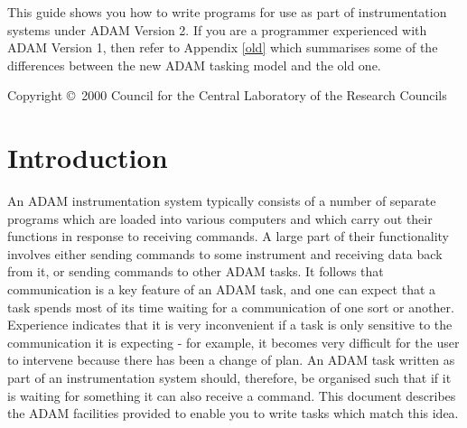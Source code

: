 \documentclass[twoside,11pt]{article}
\newcommand{\stardocinitials}  {SUN}
\newcommand{\stardoccopyright}
{Copyright \copyright\ 2000 Council for the Central Laboratory of the Research Councils}
\newcommand{\stardocnumber}    {134.3}
\newcommand{\stardocabstract}  {
This guide shows you how to write programs for use as part of
instrumentation systems under ADAM Version 2. If you are a programmer
experienced with ADAM Version 1, then refer to Appendix \ref{old} which
summarises some of the differences between the new ADAM tasking model
and the old one.
}
\newcommand{\stardocname}{\stardocinitials /\stardocnumber}
\newenvironment{latexonly}{}{}
\newcommand{\xlabel}[1]{}
\renewcommand{\_}{\texttt{\symbol{95}}}
\renewcommand{\thepage}{\roman{page}}
\begin{document}
\stardocabstract

\begin{latexonly}
\newpage
\vspace*{\fill}
\stardoccopyright
\end{latexonly}

  \newpage
  \begin{latexonly}
    \setlength{\parskip}{0mm}
    \tableofcontents
    \setlength{\parskip}{\medskipamount}
    \markboth{\stardocname}{\stardocname}
  \end{latexonly}

\cleardoublepage
\renewcommand{\thepage}{\arabic{page}}
\setcounter{page}{1}
\section{Introduction\xlabel{introduction}}

An ADAM instrumentation system typically consists of a number of
separate programs which are loaded into various computers and which
carry out their functions in response to receiving commands. A large part
of their functionality involves either sending commands to some
instrument and receiving data back from it, or sending commands to other
ADAM tasks. It follows that communication is a key feature of an ADAM
task, and one can expect that a task spends most of its time waiting for
a communication of one sort or another. Experience indicates that it is
very inconvenient if a task is only sensitive to the communication it is
expecting - for example, it becomes very difficult for the user to
intervene because there has been a change of plan. An ADAM task written
as part of an instrumentation system should, therefore, be organised
such that if it is waiting for something it can also receive a command.
This document describes the ADAM facilities provided to enable you to
write tasks which match this idea.
\end{document}
